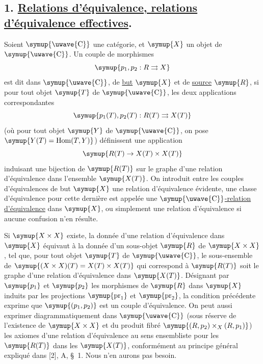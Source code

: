 \subsection*{\textnormal{1. \uline{Relations d'équivalence, relations d'équivalence effectives}.}}

Soient $\symup{\text{\uwave{C}}}$ une catégorie, et $\symup{X}$ un objet de $\symup{\text{\uwave{C}}}$. Un couple
de morphismes
\[
  \symup{p_1,p_2:R\rightrightarrows X}
\]
est dit  dans $\symup{\text{\uwave{C}}}$, de \uline{but} $\symup{X}$ et
de \uline{source} $\symup{R}$, si pour tout objet $\symup{T}$ de $\symup{\text{\uwave{C}}}$, les deux
applications correspondantes
\[
  \symup{p_1(T),p_2(T):R(T)\rightrightarrows X(T)}
\]
(où pour tout objet $\symup{Y}$ de $\symup{\text{\uwave{C}}}$, on pose
$\symup{Y(T)=\operatorname{Hom}(T,Y)}$) définissent une application
\[
  \symup{R(T)\to X(T)\times X(T)}
\]
induisant une bijection de $\symup{R(T)}$ sur le graphe d'une relation d'équivalence
dans l'ensemble $\symup{X(T)}$. On introduit entre les couples d'équivalences de but
$\symup{X}$ une relation d'équivalence évidente, une classe d'équivalence pour cette
dernière est appelée une $\symup{\text{\uwave{C}}}$\uline{-relation d'équivalence} dans $\symup{X}$,
ou simplement une relation d'équivalence si aucune confusion n'en résulte.

Si $\symup{X\times X}$ existe, la donnée d'une relation d'équivalence dans $\symup{X}$
équivaut à la donnée d'un sous-objet $\symup{R}$ de $\symup{X\times X}$, tel que, pour tout
objet $\symup{T}$ de $\symup{\text{\uwave{C}}}$, le sous-ensemble de $\symup{(X\times X)(T)=X(T)\times X(T)}$ qui correspond à $\symup{R(T)}$ soit le graphe d'une relation d'équivalence dans
$\symup{X(T)}$. Désignant par $\symup{p_1}$ et $\symup{p_2}$ les morphismes de $\symup{R}$ dans $\symup{X}$ induits
par les projections $\symup{\operatorname{pr}_1}$ et $\symup{\operatorname{pr}_2}$, la
condition précédente exprime que $\symup{(p_1,p_2)}$ est un couple d'équivalence. On
peut aussi exprimer diagrammatiquement dans $\symup{\text{\uwave{C}}}$ (sous réserve de
l'existence de $\symup{X\times X}$ et du produit fibré
$\symup{(R,p_2)\times_X(R,p_1)}$) les axiomes d'une relation d'équivalence au sens
ensembliste pour les $\symup{R(T)}$ dans les $\symup{X(T)}$, conformément au principe général
expliqué dans [2], A, \S~1. Nous n'en aurons pas besoin.


